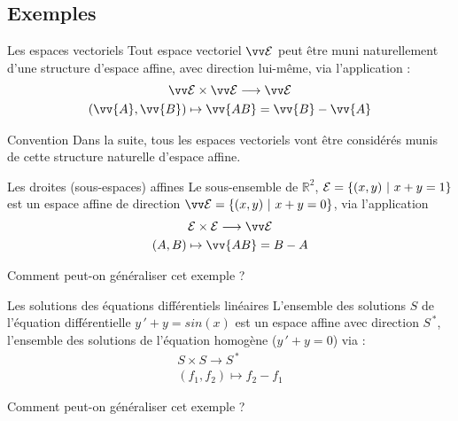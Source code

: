 \documentclass{m53beamer}
\begin{document}
\subsection{Exemples}
  \begin{frame}{Les espaces vectoriels}
    Tout espace vectoriel $\ev{E}$ peut être muni naturellement d'une structure d'espace affine, avec direction lui-même, via l'application :
    \begin{gather*}
      \ev{E} \times \ev{E} \longrightarrow \ev{E}\\
      (\vv{A},\vv{B}) \mapsto \vv{AB}=\vv{B}-\vv{A}
    \end{gather*}\pause
    \begin{block}{Convention}
      Dans la suite, tous les espaces vectoriels vont être considérés munis de cette structure naturelle d'espace affine.
    \end{block}
  \end{frame}
  \begin{frame}{Les droites (sous-espaces) affines}
    Le sous-ensemble de $\mathbb{R}^{2}$, $\mathcal{E}=\{(x,y)\ |\ x+y=1 \}$ est un espace affine de direction $\ev{E}=\{(x,y)\ |\ x+y=0 \}$, via l'application
    \begin{gather*}
      \ens{E} \times \ens{E} \longrightarrow \ev{E}\\
      (A,B) \mapsto \vv{AB}=B-A
    \end{gather*}\pause
    \begin{question}
      Comment peut-on généraliser cet exemple ?
    \end{question}
  \end{frame}
  \begin{frame}{Les solutions des équations différentiels linéaires}
    L'ensemble des solutions $S$ de l'équation différentielle $y\,'+y=sin(x)$ est un espace affine avec direction $S^{\,\ast}$, l'ensemble des solutions de l'équation homogène ($y\,'+y=0$) via :
    \begin{gather*}
      S \times S \longrightarrow S^{\,\ast}\\
      (f_{1},f_{2}) \mapsto f_{2}-f_{1}
    \end{gather*}\pause
    \begin{question}
      Comment peut-on généraliser cet exemple ?
    \end{question}
  \end{frame}
\end{document}
